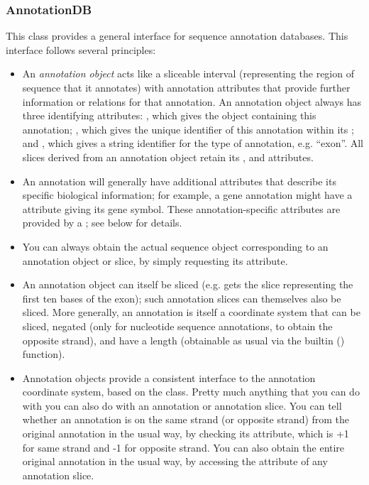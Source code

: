 \documentclass{howto}
\begin{document}
\subsubsection{AnnotationDB}
This class provides a general interface for sequence annotation databases.
This interface follows several principles:
\begin{itemize}
\item An {\em annotation object} acts like a sliceable interval
(representing the region of sequence that it annotates)
with annotation attributes that provide further information or relations
for that annotation.  An annotation object always has three identifying attributes:
, which gives the  object containing this
annotation;
, which gives the unique identifier of this annotation within
its ;
and , which gives a string identifier for the
type of annotation, e.g. ``exon''.
All slices derived from an annotation object retain its
,  and  attributes.  

\item An annotation will generally have additional attributes that
describe its specific biological information; for example,
a gene annotation might have a  attribute giving
its gene symbol.  These annotation-specific attributes are provided
by a ; see below for details. 

\item You can always obtain the actual sequence object corresponding
to an annotation object or slice, by simply requesting its
 attribute.

\item An annotation object can itself be sliced 
(e.g.  gets the slice representing
the first ten bases of the exon); such annotation slices can themselves
also be sliced.  More generally, an annotation is itself a coordinate
system that can be sliced, negated (only for nucleotide sequence 
annotations, to obtain the opposite strand), and have a length
(obtainable as usual via the builtin () function).

\item Annotation objects provide a consistent interface
to the annotation coordinate system, based on the 
class.  Pretty much anything that you can do with 
you can also do with an annotation or annotation slice.
You can tell whether
an annotation is on the same strand (or opposite strand)
from the original annotation in the usual way, by checking
its  attribute, which is +1 for same strand
and -1 for opposite strand.  You can also obtain the entire
original annotation in the usual way, by accessing the 
attribute of any annotation slice. 


\end{itemize}
\end{document}
